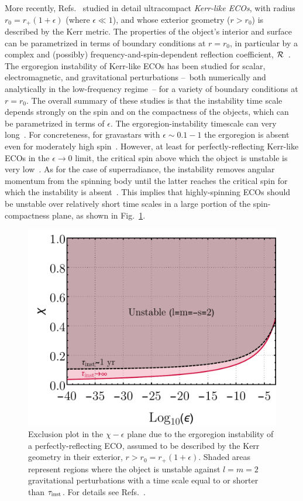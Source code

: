 \documentclass[11pt]{article}
\numberwithin{equation}{section} %
\begin{document}
More recently, Refs.~\cite{Maggio:2017ivp,Maggio:2018ivz} studied in detail ultracompact \emph{Kerr-like ECOs}, with radius $r_0=r_+(1+\epsilon)$ (where $\epsilon\ll1$), 
and whose exterior geometry ($r>r_0$) is described by the Kerr metric. The properties of the object's interior and surface can be parametrized in terms of 
boundary conditions at $r=r_0$, in particular by a complex and (possibly) frequency-and-spin-dependent
reflection coefficient, ${\cal R}$~\cite{Mark:2017dnq,Maggio:2017ivp}.
%
The ergoregion instability of Kerr-like ECOs has been studied for scalar, electromagnetic, and gravitational 
perturbations --~both numerically and analytically in the low-frequency regime~-- for a variety of boundary conditions 
at $r=r_0$.
%
The overall summary of these studies is that the instability time scale depends strongly on the spin and on the 
compactness of the objects, which can be parametrized in terms of $\epsilon$. The ergoregion-instability 
timescale can very long~\cite{Friedman:1978wla,Cardoso:2007az,Maggio:2017ivp}. For concreteness, for gravastars with 
$\epsilon\sim 0.1-1$ the ergoregion is absent even for moderately high spin~\cite{Chirenti:2008pf}. However, at least 
for perfectly-reflecting Kerr-like ECOs in the $\epsilon\to0$ limit, the critical spin above which the object is 
unstable is very low~\cite{Maggio:2018ivz}.
%
As for the case of superradiance, the instability removes angular momentum from the spinning body until the latter 
reaches the critical spin for which the instability is absent~\cite{Barausse:2018vdb}. This implies that highly-spinning 
ECOs should be unstable over relatively short time scales in a large portion of the spin-compactness plane, as shown in 
Fig.~\ref{fig:exclusion}.
%
\begin{figure}[th]
	\centering		
\includegraphics[width=.7\textwidth]{exclusion.pdf}
\caption{Exclusion plot in the $\chi-\epsilon$ plane due to the ergoregion instability of a perfectly-reflecting ECO, 
assumed to be described by the Kerr geometry in their exterior, $r>r_0=r_+(1+\epsilon)$. Shaded areas represent regions 
where the object is unstable against $l=m=2$ gravitational perturbations with a time scale equal to or shorter than 
$\tau_{\rm inst}$. 
For details see Refs.~\cite{Cardoso:2019rvt,Maggio:2017ivp,Maggio:2018ivz}.}
\label{fig:exclusion}
\end{figure}
\end{document}

